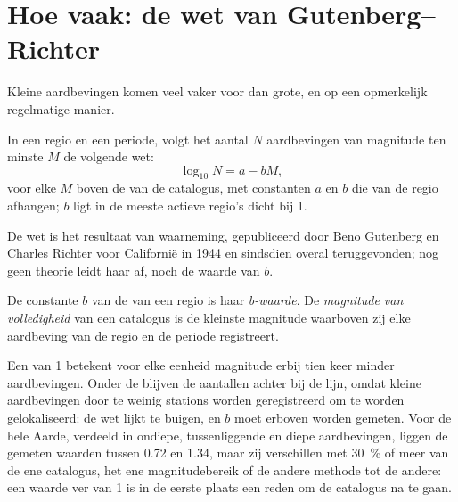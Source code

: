 \section{Hoe vaak: de wet van Gutenberg--Richter}\label{sec:b1:earthquake-source:gr}

Kleine aardbevingen komen veel vaker voor dan grote, en op een opmerkelijk regelmatige manier.

\begin{proposition}\label{prop:b1:earthquake-source:gutenberg-richter}
In een regio en een periode, volgt het aantal $N$ aardbevingen van magnitude ten minste
$M$ de volgende wet:
\[
  \log_{10} N = a - bM ,
\]
voor elke $M$ boven de  van de catalogus, met constanten $a$ en $b$ die van de regio afhangen; $b$ ligt in de meeste actieve regio's dicht bij 1.
\end{proposition}
\admitted

De wet is het resultaat van waarneming, gepubliceerd door Beno Gutenberg en Charles Richter voor Californië in 1944 en sindsdien overal teruggevonden; nog geen theorie leidt haar af, noch de waarde van $b$.

\begin{definition}\label{def:b1:earthquake-source:b-value}
De constante $b$ van de  van een regio is haar \emph{b-waarde}. De \emph{magnitude van volledigheid} van een catalogus is de kleinste magnitude waarboven zij elke aardbeving van de regio en de periode registreert.
\end{definition}

Een  van 1 betekent voor elke eenheid magnitude erbij tien keer minder aardbevingen.
Onder de  blijven de aantallen achter bij de lijn, omdat kleine aardbevingen door te weinig stations worden geregistreerd om te worden gelokaliseerd: de wet lijkt te buigen, en $b$ moet erboven worden gemeten. Voor de hele Aarde, verdeeld in ondiepe, tussenliggende en diepe aardbevingen, liggen de gemeten waarden tussen 0.72 en 1.34, maar zij verschillen met \qty{30}{\percent} of meer van de ene catalogus, het ene magnitudebereik of de andere methode tot de andere: een waarde ver van 1 is in de eerste plaats een reden om de catalogus na te gaan.

